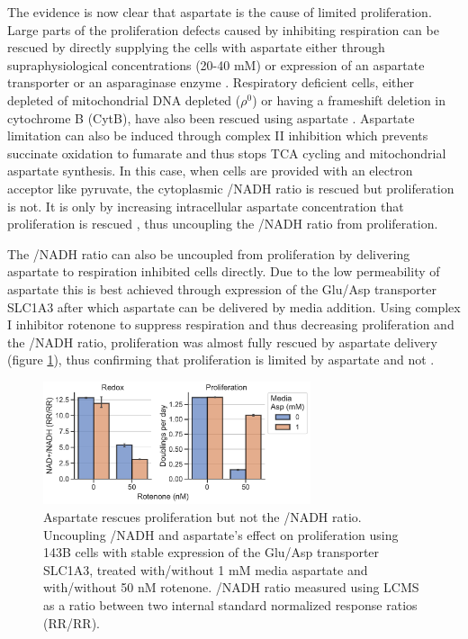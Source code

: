 The evidence is now clear that aspartate is the cause of limited proliferation.
Large parts of the proliferation defects caused by inhibiting respiration can be rescued by directly supplying the cells with aspartate either through supraphysiological concentrations (20-40 mM) \cite{Gui2016-ca, Birsoy2015-pg, Sullivan2015-xf, Krall2021-mb} or expression of an aspartate transporter or an asparaginase enzyme \cite{Birsoy2015-pg, Garcia-Bermudez2018-mj, Sullivan2018-gz}.
Respiratory deficient cells, either depleted of mitochondrial DNA depleted ($\rho^0$) or having a frameshift deletion in cytochrome B (CytB), have also been rescued using aspartate \cite{Sullivan2015-xf, Birsoy2015-pg}.
Aspartate limitation can also be induced through complex II inhibition which prevents succinate oxidation to fumarate and thus stops TCA cycling and mitochondrial aspartate synthesis.
In this case, when cells are provided with an electron acceptor like pyruvate, the cytoplasmic \NAD/NADH ratio is rescued but proliferation is not.
It is only by increasing intracellular aspartate concentration that proliferation is rescued \cite{Hart2023-gp}, thus uncoupling the \NAD/NADH ratio from proliferation.

The \NAD/NADH ratio can also be uncoupled from proliferation by delivering aspartate to respiration inhibited cells directly.
Due to the low permeability of aspartate this is best achieved through expression of the Glu/Asp transporter SLC1A3 after which aspartate can be delivered by media addition.
Using complex I inhibitor rotenone to suppress respiration and thus decreasing proliferation and the \NAD/NADH ratio, proliferation was almost fully rescued by aspartate delivery (figure \ref{fig:ch1:redox-prlfr_uncpl}), thus confirming that proliferation is limited by aspartate and not \NAD.

\begin{figure}
    \centering
    \includegraphics[width=0.70\textwidth]{figures/chap1/redox-prlfr_uncpl.pdf}
    \caption[Aspartate rescues proliferation but not the \NAD/NADH ratio]{
    Aspartate rescues proliferation but not the \NAD/NADH ratio.
    Uncoupling \NAD/NADH and aspartate's effect on proliferation using 143B cells with stable expression of the Glu/Asp transporter SLC1A3, treated with/without 1 mM media aspartate and with/without 50 nM rotenone.
    \NAD/NADH ratio measured using LCMS as a ratio between two internal standard normalized response ratios (RR/RR).
    }
    \label{fig:ch1:redox-prlfr_uncpl}
\end{figure}


